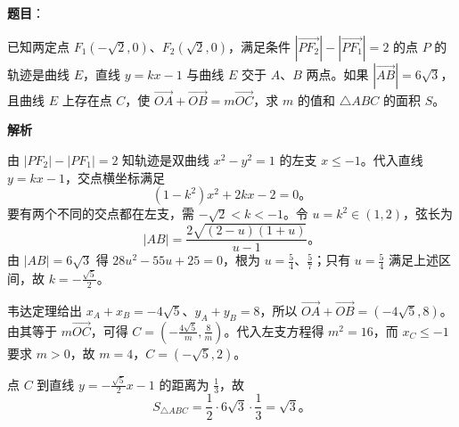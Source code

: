 \begin{answer}

\textbf{题目}：

已知两定点 $F_1(-\sqrt2,0)\text{、}F_2(\sqrt2,0)$，满足条件 $|\overrightarrow{PF_2}|-|\overrightarrow{PF_1}|=2$ 的点 $P$ 的轨迹是曲线 $E$，直线 $y=kx-1$ 与曲线 $E$ 交于 $A\text{、}B$ 两点。如果 $|\overrightarrow{AB}|=6\sqrt3$，且曲线 $E$ 上存在点 $C$，使 $\overrightarrow{OA}+\overrightarrow{OB}=m\overrightarrow{OC}$，求 $m$ 的值和 $\triangle ABC$ 的面积 $S$。

\textbf{解析}

由 $|PF_2|-|PF_1|=2$ 知轨迹是双曲线 $x^2-y^2=1$ 的左支 $x\leqslant-1$。代入直线 $y=kx-1$，交点横坐标满足
\nopagebreak[4]
\[
(1-k^2)x^2+2kx-2=0\mbox{。}
\]
要有两个不同的交点都在左支，需 $-\sqrt2<k<-1$。令 $u=k^2\in(1,2)$，弦长为
\nopagebreak[4]
\[
|AB|=\frac{2\sqrt{(2-u)(1+u)}}{u-1}\mbox{。}
\]
由 $|AB|=6\sqrt3$ 得 $28u^2-55u+25=0$，根为 $u=\frac54\text{、}\frac57$；只有 $u=\frac54$ 满足上述区间，故 $k=-\frac{\sqrt5}2$。

韦达定理给出 $x_A+x_B=-4\sqrt5$、$y_A+y_B=8$，所以 $\overrightarrow{OA}+\overrightarrow{OB}=(-4\sqrt5,8)$。由其等于 $m\overrightarrow{OC}$，可得 $C=(-\frac{4\sqrt5}{m},\frac8m)$。代入左支方程得 $m^2=16$，而 $x_C\leqslant-1$ 要求 $m>0$，故 $m=4$，$C=(-\sqrt5,2)$。

点 $C$ 到直线 $y=-\frac{\sqrt5}{2}x-1$ 的距离为 $\frac13$，故
\nopagebreak[4]
\[
S_{\triangle ABC}=\frac12\cdot6\sqrt3\cdot\frac13=\sqrt3\mbox{。}
\]


\end{answer}
